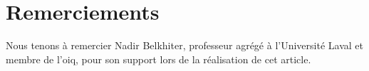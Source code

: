 \section*{Remerciements}
Nous tenons à remercier Nadir Belkhiter, professeur agrégé à l'Université Laval et membre de l'\gls{oiq}, pour son support lors de la réalisation de cet article. 
